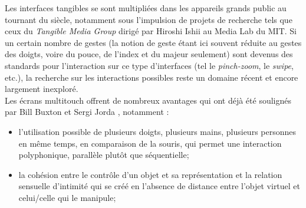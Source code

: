 \noindent Les interfaces tangibles se sont multipliées dans les appareils grands public au tournant du siècle, notamment sous l'impulsion de projets de recherche tels que ceux du \textit{Tangible Media Group} dirigé par Hiroshi Ishii au Media Lab du \gls{MIT}. Si un certain nombre de gestes (la notion de geste étant ici souvent réduite au gestes des doigts, voire du pouce, de l'index et du majeur seulement) sont devenus des standards pour l'interaction sur ce type d'interfaces (tel le \textit{pinch-zoom}, le \textit{swipe}, etc.), la recherche sur les interactions possibles reste un domaine récent et encore largement inexploré.\\
\indent Les écrans multitouch offrent de nombreux avantages qui ont déjà été soulignés par Bill Buxton \cite{buxton_multi-touch_2007} et Sergi Jorda \cite{jorda_digital_2005}, notamment :

\vspace{-1em}
\begin{itemize}[noitemsep]
	\item l'utilisation possible de plusieurs doigts, plusieurs mains, plusieurs personnes en même temps, en comparaison de la souris, qui permet une interaction polyphonique, parallèle plutôt que séquentielle;
	\item la cohésion entre le contrôle d'un objet et sa représentation et la relation sensuelle d'intimité qui se créé en l'absence de distance entre l'objet virtuel et celui/celle qui le manipule;
\end{itemize}

